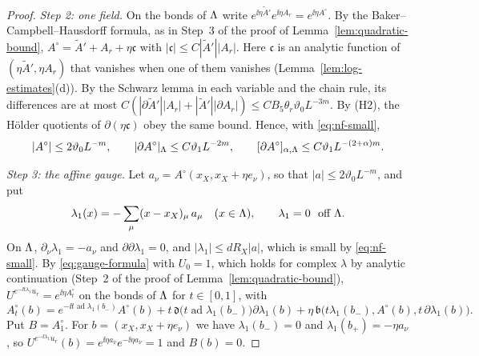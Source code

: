 \begin{proof}
\emph{Step 2: one field.} On the bonds of $\Lambda$ write $e^{\ii\eta\tilde A'}e^{\ii\eta A_r}=e^{\ii\eta A^\circ}$. By the Baker--Campbell--Hausdorff formula, as in Step~3 of the proof of Lemma~\ref{lem:quadratic-bound}, $A^\circ=\tilde A'+A_r+\eta\mathfrak c$ with $|\mathfrak c|\le C|\tilde A'||A_r|$. Here $\mathfrak c$ is an analytic function of $(\eta\tilde A',\eta A_r)$ that vanishes when one of them vanishes (Lemma~\ref{lem:log-estimates}(d)). By the Schwarz lemma in each variable and the chain rule, its differences are at most $C(|\partial\tilde A'||A_r|+|\tilde A'||\partial A_r|)\le CB_5\theta_r\vartheta_0L^{-3m}$. By (H2), the H\"older quotients of $\partial(\eta\mathfrak c)$ obey the same bound. Hence, with \eqref{eq:nf-small},
\begin{equation}\label{eq:nf-step2}
|A^\circ|\le2\vartheta_0L^{-m},\qquad|\partial A^\circ|_\Lambda\le C\vartheta_1L^{-2m},\qquad[\partial A^\circ]_{\alpha,\Lambda}\le C\vartheta_1L^{-(2+\alpha)m}.
\end{equation}

\emph{Step 3: the affine gauge.} Let $a_\nu=A^\circ(x_X,x_X+\eta e_\nu)$, so that $|a|\le2\vartheta_0L^{-m}$, and put
\[
\lambda_1(x)=-\sum_\mu(x-x_X)_\mu\,a_\mu\quad(x\in\Lam),\qquad\lambda_1=0\ \text{ off }\Lam .
\]
On $\Lambda$, $\partial_\nu\lambda_1=-a_\nu$ and $\partial\partial\lambda_1=0$, and $|\lambda_1|\le dR_X|a|$, which is small by \eqref{eq:nf-small}. By \eqref{eq:gauge-formula} with $U_0=1$, which holds for complex $\lambda$ by analytic continuation (Step~2 of the proof of Lemma~\ref{lem:quadratic-bound}), $U^{e^{-\ii t\lambda_1}u_r}=e^{\ii\eta A^\circ_t}$ on the bonds of $\Lambda$ for $t\in[0,1]$, with
\[
A^\circ_t(b)=e^{-\ii t\operatorname{ad}\lambda_1(b_-)}A^\circ(b)+t\,\mathfrak d\big(t\operatorname{ad}\lambda_1(b_-)\big)\partial\lambda_1(b)+\eta\,\mathfrak b\big(t\lambda_1(b_-),A^\circ(b),t\,\partial\lambda_1(b)\big).
\]
Put $B=A^\circ_1$. For $b=(x_X,x_X+\eta e_\nu)$ we have $\lambda_1(b_-)=0$ and $\lambda_1(b_+)=-\eta a_\nu$, so $U^{e^{-\ii\lambda_1}u_r}(b)=e^{\ii\eta a_\nu}e^{-\ii\eta a_\nu}=1$ and $B(b)=0$.


\end{proof}
